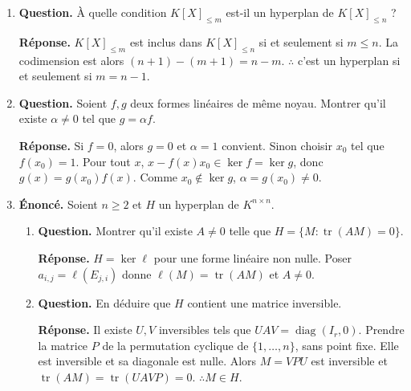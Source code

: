 \documentclass[12pt, a4paper]{article}
\begin{document}
\begin{enumerate}[label=7.\arabic*., start=68]
  \item \begin{minipage}[t]{\linewidth}\raggedright
\textbf{Question.} À quelle condition $K[X]_{\leq m}$ est-il un hyperplan de $K[X]_{\leq n}$ ?
\par\smallskip
\textbf{Réponse.} $K[X]_{\leq m}$ est inclus dans $K[X]_{\leq n}$ si et seulement si $m\leq n$.
    La codimension est alors $(n+1)-(m+1)=n-m$.
    $\therefore$ c'est un hyperplan si et seulement si $m=n-1$.
\end{minipage}

  \item \begin{minipage}[t]{\linewidth}\raggedright
\textbf{Question.} Soient $f,g$ deux formes linéaires de même noyau. Montrer qu’il existe $\alpha\neq0$ tel que $g=\alpha f$.
\par\smallskip
\textbf{Réponse.} Si $f=0$, alors $g=0$ et $\alpha=1$ convient.
    Sinon choisir $x_0$ tel que $f(x_0)=1$.
    Pour tout $x$, $x-f(x)x_0\in\ker f=\ker g$, donc $g(x)=g(x_0)f(x)$.
    Comme $x_0\notin\ker g$, $\alpha=g(x_0)\neq0$.
\end{minipage}

  \item \begin{minipage}[t]{\linewidth}\raggedright
\textbf{Énoncé.} Soient $n\geq2$ et $H$ un hyperplan de $K^{n\times n}$.

\begin{enumerate}[\arabic*.]
        \item \textbf{Question.} Montrer qu’il existe $A\neq0$ telle que $H=\{M:\operatorname{tr}(AM)=0\}$.
\par\smallskip
\textbf{Réponse.} $H=\ker\ell$ pour une forme linéaire non nulle.
        Poser $a_{i,j}=\ell(E_{j,i})$ donne $\ell(M)=\operatorname{tr}(AM)$ et $A\neq0$.

  \item \textbf{Question.} En déduire que $H$ contient une matrice inversible.
\par\smallskip
\textbf{Réponse.} Il existe $U,V$ inversibles tels que $UAV=\operatorname{diag}(I_r,0)$.
        Prendre la matrice $P$ de la permutation cyclique de $\{1,\ldots,n\}$, sans point fixe.
        Elle est inversible et sa diagonale est nulle.
        Alors $M=VPU$ est inversible et
        $\operatorname{tr}(AM)=\operatorname{tr}(UAVP)=0$.
        $\therefore M\in H$.

\end{enumerate}
\end{minipage}


\end{enumerate}
\end{document}
